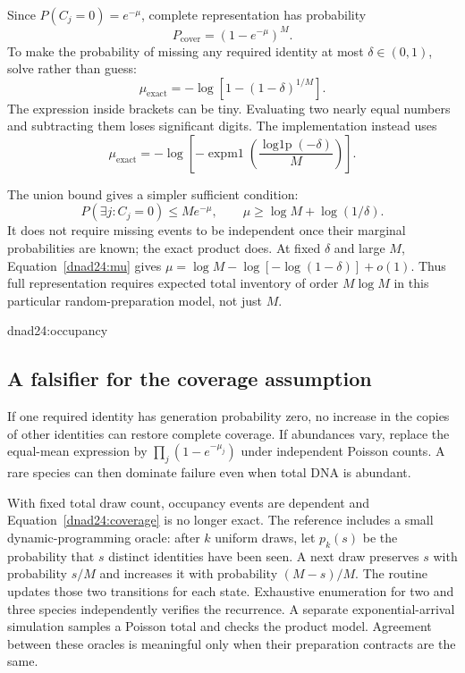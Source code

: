 Since $P(C_j=0)=e^{-\mu}$, complete representation has probability
\begin{equation}
P_{\mathrm{cover}}=(1-e^{-\mu})^M.
\label{dnad24:coverage}
\end{equation}
To make the probability of missing any required identity at most
$\delta\in(0,1)$, solve rather than guess:
\begin{equation}
\mu_{\mathrm{exact}}
=-\log\!\left[1-(1-\delta)^{1/M}\right].
\label{dnad24:mu}
\end{equation}
The expression inside brackets can be tiny. Evaluating two nearly equal numbers
and subtracting them loses significant digits. The implementation instead uses
\[
\mu_{\mathrm{exact}}
=-\log\!\left[-\operatorname{expm1}
  \left(\frac{\operatorname{log1p}(-\delta)}{M}\right)\right].
\]

The union bound gives a simpler sufficient condition:
\[
P(\exists j:C_j=0)\le M e^{-\mu},
\qquad \mu\ge\log M+\log(1/\delta).
\]
It does not require missing events to be independent once their marginal
probabilities are known; the exact product does. At fixed $\delta$ and large $M$,
Equation~\ref{dnad24:mu} gives
$\mu=\log M-\log[-\log(1-\delta)]+o(1)$.
Thus full representation requires expected total inventory of order
$M\log M$ in this particular random-preparation model, not just $M$.

{dnad24:occupancy}

\subsection{A falsifier for the coverage assumption}
If one required identity has generation probability zero, no increase in the
copies of other identities can restore complete coverage. If abundances vary,
replace the equal-mean expression by
$\prod_j(1-e^{-\mu_j})$ under independent Poisson counts. A rare species can then
dominate failure even when total DNA is abundant.

With fixed total draw count, occupancy events are dependent and
Equation~\ref{dnad24:coverage} is no longer exact. The reference includes a small
dynamic-programming oracle: after $k$ uniform draws, let $p_k(s)$ be the probability
that $s$ distinct identities have been seen. A next draw preserves $s$ with
probability $s/M$ and increases it with probability $(M-s)/M$.
The routine updates those two transitions for each state.
Exhaustive enumeration for two and three species independently verifies the
recurrence. A separate exponential-arrival simulation samples a Poisson total and
checks the product model. Agreement between these oracles is meaningful only when
their preparation contracts are the same.

